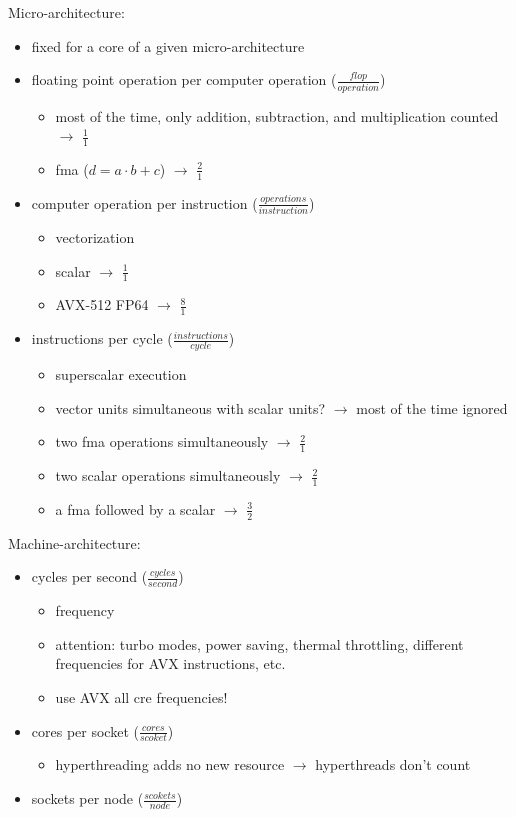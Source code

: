 \newpage
Micro-architecture:
\begin{itemize}
    \item fixed for a core of a given micro-architecture
    \item floating point operation per computer operation ($\frac{flop}{operation}$)
    \begin{itemize}
        \item most of the time, only addition, subtraction, and multiplication counted $\rightarrow$ $\frac{1}{1}$
        \item \gls{fma} ($d = a \cdot b + c$) $\rightarrow$ $\frac{2}{1}$
    \end{itemize}
    \item computer operation per instruction ($\frac{operations}{instruction}$)
    \begin{itemize}
        \item vectorization
        \item scalar $\rightarrow$ $\frac{1}{1}$
        \item AVX-512 FP64 $\rightarrow$ $\frac{8}{1}$
    \end{itemize}
    \item instructions per cycle ($\frac{instructions}{cycle}$)
    \begin{itemize}
        \item superscalar execution
        \item vector units simultaneous with scalar units? $\rightarrow$ most of the time ignored
        \item two \gls{fma} operations simultaneously $\rightarrow$ $\frac{2}{1}$
        \item two scalar operations simultaneously $\rightarrow$ $\frac{2}{1}$
        \item a \gls{fma} followed by a scalar $\rightarrow$ $\frac{3}{2}$
    \end{itemize}
\end{itemize}

Machine-architecture:
\begin{itemize}
    \item cycles per second ($\frac{cycles}{second}$)
    \begin{itemize}
        \item frequency
        \item attention: turbo modes, power saving, thermal throttling, different frequencies for AVX instructions, etc.
        \item use AVX all cre frequencies!
    \end{itemize}
    \item cores per socket ($\frac{cores}{scoket}$)
    \begin{itemize}
        \item hyperthreading adds no new resource $\rightarrow$ hyperthreads don't count
    \end{itemize}
    \item sockets per node ($\frac{scokets}{node}$)
\end{itemize}

